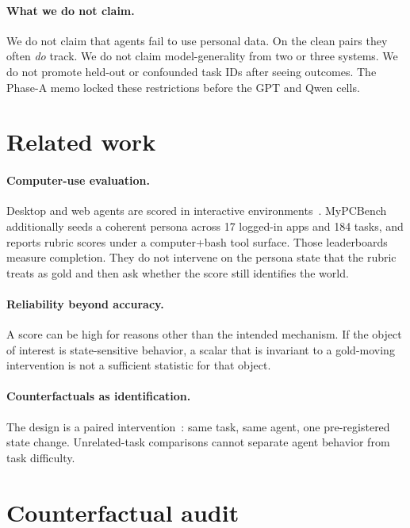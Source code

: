 \documentclass[11pt]{article}
\begin{document}
\paragraph{What we do not claim.}
We do not claim that agents fail to use personal data. On the clean
pairs they often \emph{do} track. We do not claim model-generality from
two or three systems. We do not
promote held-out or confounded task IDs after seeing outcomes.
The Phase-A memo locked these restrictions before the GPT and Qwen cells.

\section{Related work}

\paragraph{Computer-use evaluation.}
Desktop and web agents are scored in interactive
environments~\citep{xie2024osworld,zhou2024webarena,koh2024visualwebarena}.
MyPCBench~\citep{jang2026mypcbench} additionally seeds a coherent
persona across 17 logged-in apps and 184 tasks, and reports rubric
scores under a computer+bash tool surface. Those leaderboards measure
completion. They do not intervene on the persona state that the rubric
treats as gold and then ask whether the score still identifies the
world.

\paragraph{Reliability beyond accuracy.}
A score can be high for reasons other than the intended mechanism.
If the object of interest is state-sensitive behavior, a scalar that is
invariant to a gold-moving intervention is not a sufficient statistic
for that object.

\paragraph{Counterfactuals as identification.}
The design is a paired intervention~\citep{pearl2009causality}: same
task, same agent, one pre-registered state change. Unrelated-task
comparisons cannot separate agent behavior from task difficulty.

\section{Counterfactual audit}
\end{document}
